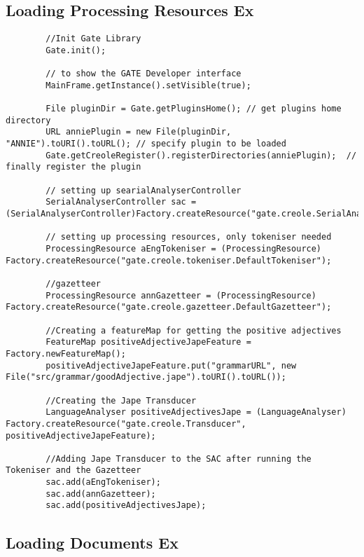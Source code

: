 \documentclass[a4paper,12pt]{report}
\begin{document}
\subsection{Loading Processing Resources Ex}
\label{sec:java1}
\begin{lstlisting}
		//Init Gate Library
		Gate.init();	
		
		// to show the GATE Developer interface
		MainFrame.getInstance().setVisible(true);	
		
		File pluginDir = Gate.getPluginsHome();	// get plugins home directory
		URL anniePlugin = new File(pluginDir, "ANNIE").toURI().toURL();	// specify plugin to be loaded
		Gate.getCreoleRegister().registerDirectories(anniePlugin);	// finally register the plugin
		
		// setting up searialAnalyserController
		SerialAnalyserController sac = (SerialAnalyserController)Factory.createResource("gate.creole.SerialAnalyserController");

		// setting up processing resources, only tokeniser needed
		ProcessingResource aEngTokeniser = (ProcessingResource) Factory.createResource("gate.creole.tokeniser.DefaultTokeniser");
		
		//gazetteer
		ProcessingResource annGazetteer = (ProcessingResource) Factory.createResource("gate.creole.gazetteer.DefaultGazetteer");
		
		//Creating a featureMap for getting the positive adjectives
		FeatureMap positiveAdjectiveJapeFeature = Factory.newFeatureMap();
		positiveAdjectiveJapeFeature.put("grammarURL", new File("src/grammar/goodAdjective.jape").toURI().toURL());
		
		//Creating the Jape Transducer
		LanguageAnalyser positiveAdjectivesJape = (LanguageAnalyser) Factory.createResource("gate.creole.Transducer", positiveAdjectiveJapeFeature);
		
		//Adding Jape Transducer to the SAC after running the Tokeniser and the Gazetteer
		sac.add(aEngTokeniser);
		sac.add(annGazetteer);
		sac.add(positiveAdjectivesJape);
\end{lstlisting}

\subsection{Loading Documents Ex}
\label{sec:java2}
\end{document}
